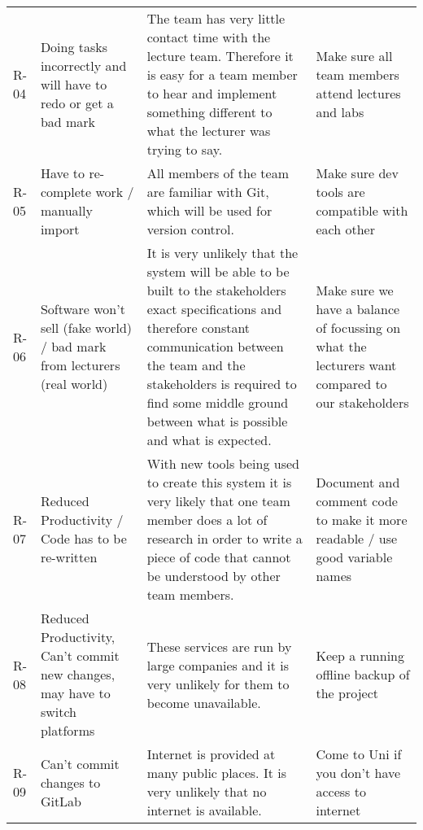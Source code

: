 \begin{table}
\begin{tabular}{llll}
        R-04 & Doing tasks incorrectly and will have to redo or get a bad mark                              & The team has very little contact time with the lecture team. Therefore it is easy for a team member to hear and implement something different to what the lecturer was trying to say.                                                                                  & Make sure all team members attend lectures and labs                                               \\
        R-05 & Have to re-complete work / manually import                                                   & All members of the team are familiar with Git, which will be used for version control.                                                                                                                                                                                 & Make sure dev tools are compatible with each other                                                \\
        R-06 & Software won’t sell (fake world) / bad mark from lecturers (real world)                      & It is very unlikely that the system will be able to be built to the stakeholders exact specifications and therefore constant communication between the team and the stakeholders is required to find some middle ground between what is possible and what is expected. & Make sure we have a balance of focussing on what the lecturers want compared to our stakeholders  \\
        R-07 & Reduced Productivity / Code has to be re-written                                             & With new tools being used to create this system it is very likely that one team member does a lot of research in order to write a piece of code that cannot be understood by other team members.                                                                       & Document and comment code to make it more readable / use good variable names                      \\
        R-08 & Reduced Productivity, Can’t commit new changes, may have to switch platforms                 & These services are run by large companies and it is very unlikely for them to become unavailable.                                                                                                                                                                      & Keep a running offline backup of the project                                                      \\
        R-09 & Can’t commit changes to GitLab                                                               & Internet is provided at many public places. It is very unlikely that no internet is available.                                                                                                                                                                         & Come to Uni if you don’t have access to internet                                                  \\

\end{tabular}
\end{table}
